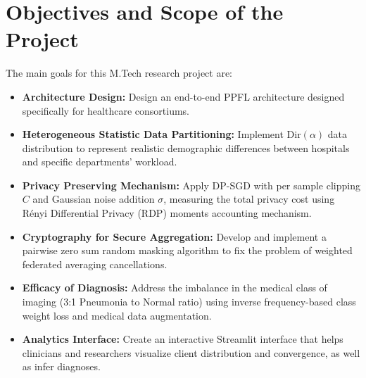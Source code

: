 \documentclass[12pt,a4paper]{report}
\begin{document}
\section{Objectives and Scope of the Project}
The main goals for this M.Tech research project are:
\begin{itemize}
    \item \textbf{Architecture Design:} Design an end-to-end PPFL architecture designed specifically for healthcare consortiums.
    \item \textbf{Heterogeneous Statistic Data Partitioning:} Implement $\text{Dir}(\alpha)$ data distribution to represent realistic demographic differences between hospitals and specific departments' workload.
    \item \textbf{Privacy Preserving Mechanism:} Apply DP-SGD with per sample clipping $C$ and Gaussian noise addition $\sigma$, measuring the total privacy cost using Rényi Differential Privacy (RDP) moments accounting mechanism.
    \item \textbf{Cryptography for Secure Aggregation:} Develop and implement a pairwise zero sum random masking algorithm to fix the problem of weighted federated averaging cancellations.
    \item \textbf{Efficacy of Diagnosis:} Address the imbalance in the medical class of imaging (3:1 Pneumonia to Normal ratio) using inverse frequency-based class weight loss and medical data augmentation.
    \item \textbf{Analytics Interface:} Create an interactive Streamlit interface that helps clinicians and researchers visualize client distribution and convergence, as well as infer diagnoses.
\end{itemize}
\end{document}
